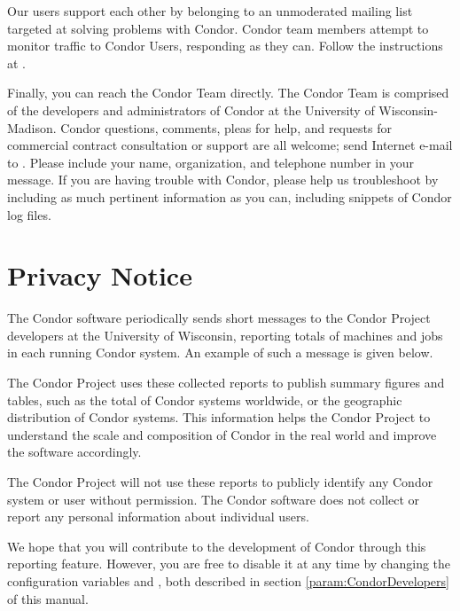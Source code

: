 Our users support each other by belonging to an unmoderated mailing
list targeted at solving problems with Condor.
Condor team members attempt to monitor traffic to Condor Users,
responding as they can. 
Follow the instructions at
.

Finally, you can reach the Condor Team directly.
The Condor Team is comprised of the 
developers and administrators of Condor at the University of Wisconsin-Madison.
Condor questions, comments, pleas for help,
and requests for commercial contract consultation or support 
are all welcome;
send Internet e-mail to
.
Please include your name, organization, and telephone number in your message.
If you are having trouble with Condor,
please help us troubleshoot by including as much pertinent information
as you can, including snippets of Condor log files. 

\section{\label{privacy}Privacy Notice}

%
%

The Condor software periodically sends short messages
to the Condor Project developers at the University of Wisconsin,
reporting totals of machines and jobs in each running Condor system.
An example of such a message is given below.

The Condor Project uses these collected reports to publish
summary figures and tables, such as the total of Condor systems
worldwide, or the geographic distribution of Condor systems.
This information helps the Condor Project to understand
the scale and composition of Condor in the real world
and improve the software accordingly.

The Condor Project will not use these reports to publicly
identify any Condor system or user without permission.
The Condor software does not collect or report any personal
information about individual users.

We hope that you will contribute to the development of Condor
through this reporting feature.
However, you are free to disable it at any time by
changing the configuration variables 
and ,
both described in section \ref{param:CondorDevelopers} of this manual.

